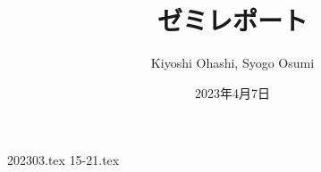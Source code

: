 \documentclass{jsarticle}
\title{ゼミレポート}
\author{Kiyoshi Ohashi, Syogo Osumi}
\date{2023年4月7日}
\begin{document}
  \maketitle

  {202303.tex}
  {15-21.tex}
\end{document}

